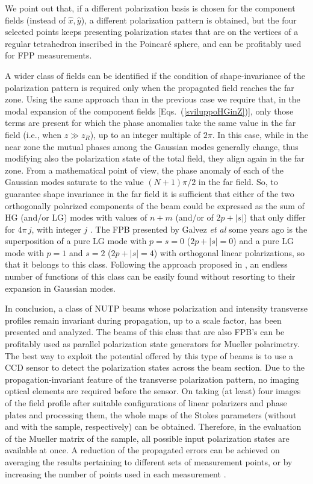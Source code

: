 \documentclass{article}
\begin{document}
We point out that, if a different polarization basis is chosen for the component fields (instead of $\hat x, {\hat y}$), a different polarization pattern is obtained, but the four selected points keeps presenting polarization states that are on the vertices of a regular tetrahedron inscribed in the Poincar\'e sphere, and can be profitably used for FPP measurements.

A wider class of fields can be identified if the condition of shape-invariance of the polarization pattern is required only when the propagated field reaches the far zone. 
Using the same approach than in the previous case we require that, in the modal expansion of the component fields [Eqs.~(\ref{sviluppoHGinZ})], only those terms are present for which the phase anomalies take the same value in the far field (i.e., when $z \gg z_R$), up to an integer multiple of $2 \pi$. In this case, while in the near zone the mutual phases among the Gaussian modes generally change, thus modifying also the polarization state of the total field, they align again in the far zone.
From a mathematical point of view,  the phase anomaly of each of the Gaussian modes saturate to the value $(N+1) \pi/2$ in the far field. So, to guarantee shape invariance in the far field it is sufficient that either of the two orthogonally polarized components of the beam could be expressed as the sum of HG (and/or LG) modes with values of $n+m$ (and/or of $2p + |s|$) that only differ for $4 \pi \, j$, with integer $j$ \cite{Cincotti:JPA92}.
The FPB presented by Galvez \emph{et al} some years ago \cite{Galvez:AO12} is the superposition of a pure LG mode with $p=s=0$ ($2p+|s|=0$) and a pure LG mode with $p=1$ and $s=2$ ($2p+|s|=4$) with orthogonal linear polarizations, so that it belongs to this class. Following the approach proposed in \cite{Cincotti:JPA92}, 
an endless number of functions of this class can be easily found without resorting to their expansion in Gaussian modes.

\vspace{.5cm}

In conclusion, a class of NUTP beams whose polarization and intensity transverse profiles remain invariant during propagation, up to a scale factor, has been presented and analyzed. The beams of this class that are also FPB's can be profitably used as parallel polarization state generators for Mueller polarimetry. 
The best way to exploit the potential offered by this type of beams is to use a CCD sensor to detect the polarization states across the beam section. Due to the propagation-invariant feature of the transverse polarization pattern, no imaging optical elements are required before the sensor. On taking (at least) four images of the field profile after suitable configurations of linear polarizers and phase plates \cite{chipman18,Goldstein03} and processing them, the whole maps of the Stokes parameters (without and with the sample, respectively) can be obtained. Therefore, in the evaluation of the Mueller matrix of the sample, all possible input polarization states are available at once. A reduction of the propagated errors can be achieved on averaging the results pertaining to different sets of measurement points, or by increasing the number of points used in each measurement \cite{Layden:OE12,Twietmeyer:OE08}.
\end{document}

